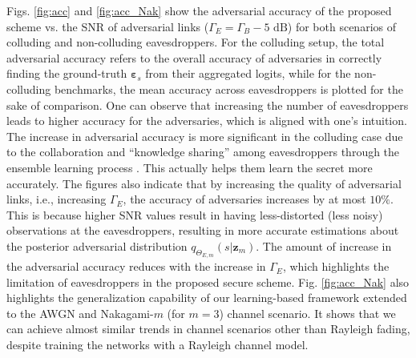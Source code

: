 \documentclass[conference]{IEEEtran}
\begin{document}
{{	
	Figs. 
\ref{fig:acc}
and
\ref{fig:acc_Nak}
show the adversarial accuracy of the  proposed scheme vs. the SNR of adversarial links ($\Gamma_E = \Gamma_{B} - 5 \text{ dB}$) for both scenarios of colluding and non-colluding  eavesdroppers. 
	For the colluding setup, the total adversarial accuracy refers to the overall accuracy of adversaries in correctly finding the ground-truth $\bm \varepsilon_s$ from their aggregated logits, while for the non-colluding benchmarks, the mean accuracy across eavesdroppers is plotted for the sake of comparison. 
	One can observe that increasing the number of eavesdroppers leads to   higher  accuracy for the adversaries, which is aligned with one's intuition.  
	The increase in adversarial accuracy is more significant in the colluding case due to the collaboration and ``knowledge sharing''  among eavesdroppers through the ensemble learning process \cite{ensemble}. This actually   helps them learn the secret more accurately. 
	The figures also indicate that by increasing the quality of adversarial links, i.e., increasing $\Gamma_{E}$, 
	the accuracy of adversaries  
	increases by 
	at most  $10\%$.  
	This is because  higher SNR values result in having less-distorted (less noisy) observations at the eavesdroppers, resulting  in  more accurate  estimations  about the  posterior adversarial distribution  $q_{\Theta_{E,m}}({s|{\bm z}_m})$. 
	The amount of increase in the adversarial accuracy reduces with the increase in $\Gamma_E$, which highlights the limitation of eavesdroppers in the  proposed secure scheme. 
	Fig. 
	\ref{fig:acc_Nak} 
	also highlights  the generalization capability of our learning-based  framework 
	extended to 
	the AWGN  and Nakagami-$m$ (for $m=3$) channel scenario. 
It shows that we can achieve almost similar  trends in channel scenarios other than Rayleigh fading, despite training the networks with a Rayleigh channel model. 
}}
\end{document}
